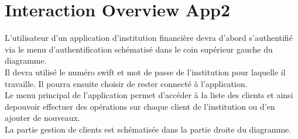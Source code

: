 \documentclass{article}
\begin{document}
\section{Interaction Overview App2}
L'utilisateur d'un application d'institution financière devra d'abord s'authentifié via le menu d'authentification schématisé dans le coin supérieur gauche du diagramme.\\
Il devra utilisé le numéro swift et mot de passe de l'institution pour laquelle il travaille. Il pourra ensuite choisir de rester connecté à l'application.\\
Le menu principal de l'application permet d'accéder à la liste des clients et ainsi depouvoir effectuer des opérations sur chaque client de l'institution ou d'en ajouter de nouveaux.\\
La partie gestion de clients est schématisée dans la partie droite du diagramme.
\end{document}
